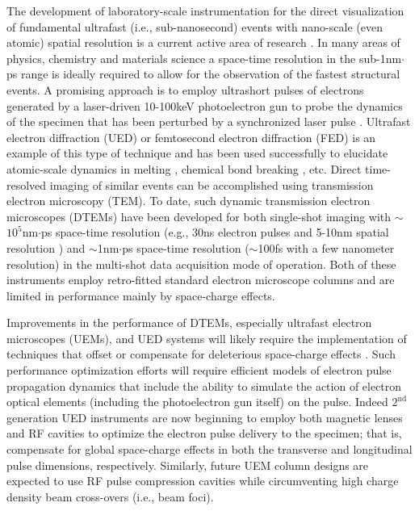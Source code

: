 The development of laboratory-scale instrumentation for the direct visualization of fundamental ultrafast (i.e., sub-nanosecond) events with nano-scale (even atomic) spatial resolution is a current active area of research \cite{king_ultrafast_2005}.
In many areas of physics, chemistry and materials science a space-time resolution in the sub-1nm$\cdot$ps range is ideally required to allow for the observation of the fastest structural events.
A promising approach is to employ ultrashort pulses of electrons generated by a laser-driven 10-100keV photoelectron gun to probe the dynamics of the specimen that has been perturbed by a synchronized laser pulse \cite{king_ultrafast_2005}.
Ultrafast electron diffraction (UED) or femtosecond electron diffraction (FED) \cite{srinivasan_ultrafast_2003,williamson_clocking_1997,cao_femtosecond_2003} is an example of this type of technique and has been used successfully to elucidate atomic-scale dynamics in melting \cite{cao_femtosecond_2003,sciaini_electronic_2009,siwick_atomic-level_2003}, chemical bond breaking \cite{zewail_laser_1988}, etc.
Direct time-resolved imaging of similar events can be accomplished using transmission electron microscopy (TEM).
To date, such dynamic transmission electron microscopes (DTEMs) \cite{bostanjoglo_tracing_1980,domer_high-speed_2003} have been developed for both single-shot imaging with $\sim$$10^{5}$nm$\cdot$ps space-time resolution (e.g., 30ns electron pulses and 5-10nm spatial resolution \cite{lagrange_single-shot_2006,armstrong_practical_2007}) and $\sim$1nm$\cdot$ps space-time resolution ($\sim$100fs with a few nanometer resolution\cite{park_direct_2009}) in the multi-shot data acquisition mode of operation.
Both of these instruments employ retro-fitted standard electron microscope columns and are limited in performance mainly by space-charge effects.

Improvements in the performance of DTEMs, especially ultrafast electron microscopes (UEMs), and UED systems will likely require the implementation of techniques that offset or compensate for deleterious space-charge effects \cite{armstrong_prospects_2007,lobastov_four-dimensional_2005}.
Such performance optimization efforts will require efficient models of electron pulse propagation dynamics that include the ability to simulate the action of electron optical elements (including the photoelectron gun itself) on the pulse.
Indeed $2^{\text{nd}}$ generation UED instruments are now beginning to employ both magnetic lenses and RF cavities \cite{oudheusden_electron_2007,veisz_hybrid_2007} to optimize the electron pulse delivery to the specimen; that is, compensate for global space-charge effects in both the transverse and longitudinal pulse dimensions, respectively.
Similarly, future UEM column designs are expected to use RF pulse compression cavities while circumventing high charge density beam cross-overs (i.e., beam foci).

